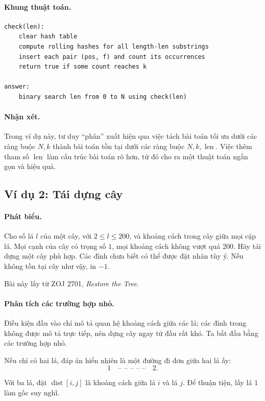 \documentclass[11pt]{article}
\newcommand{\dist}{\operatorname{dist}}
\newcommand{\len}{\operatorname{len}}
\begin{document}
\paragraph{Khung thuật toán.}
\begin{verbatim}
check(len):
    clear hash table
    compute rolling hashes for all length-len substrings
    insert each pair (pos, f) and count its occurrences
    return true if some count reaches k

answer:
    binary search len from 0 to N using check(len)
\end{verbatim}

\paragraph{Nhận xét.}
Trong ví dụ này, tư duy ``phân'' xuất hiện qua việc tách bài toán tối ưu dưới
các ràng buộc \(N,k\) thành bài toán tồn tại dưới các ràng buộc \(N,k,\len\).
Việc thêm tham số \(\len\) làm cấu trúc bài toán rõ hơn, từ đó cho ra một
thuật toán ngắn gọn và hiệu quả.

\subsection{Ví dụ 2: Tái dựng cây}

\paragraph{Phát biểu.}
Cho số lá \(l\) của một cây, với \(2\le l\le 200\), và khoảng cách trong cây
giữa mọi cặp lá. Mọi cạnh của cây có trọng số \(1\), mọi khoảng cách không
vượt quá \(200\). Hãy tái dựng một cây phù hợp. Các đỉnh chưa biết có thể được
đặt nhãn tùy ý. Nếu không tồn tại cây như vậy, in \(-1\).

Bài này lấy từ ZOJ 2701, \textit{Restore the Tree}.

\paragraph{Phân tích các trường hợp nhỏ.}
Điều kiện đầu vào chỉ mô tả quan hệ khoảng cách giữa các lá; các đỉnh trong
không được mô tả trực tiếp, nên dựng cây ngay từ đầu rất khó. Ta bắt đầu bằng
các trường hợp nhỏ.

Nếu chỉ có hai lá, đáp án hiển nhiên là một đường đi đơn giữa hai lá ấy:
\[
  1 \quad \text{-- -- -- -- --} \quad 2.
\]

Với ba lá, đặt \(\dist[i,j]\) là khoảng cách giữa lá \(i\) và lá \(j\). Để
thuận tiện, lấy lá \(1\) làm gốc suy nghĩ.
\end{document}
